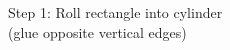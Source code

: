 \documentclass[preview]{standalone}
\begin{document}
\begin{center}
Step 1: Roll rectangle into cylinder\\(glue opposite vertical edges)
\end{center}
\end{document}
